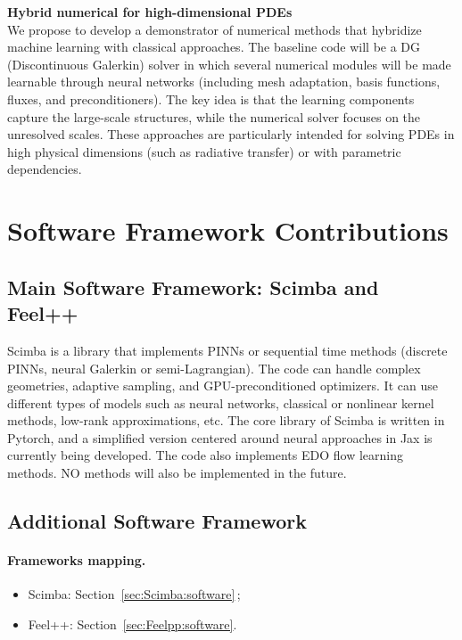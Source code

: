 \textbf{Hybrid numerical for high-dimensional PDEs}\\

We  propose  to  develop  a demonstrator  of  numerical  methods  that
hybridize  machine learning  with classical  approaches. The  baseline
code will  be a  DG (Discontinuous Galerkin)  solver in  which several
numerical  modules  will be  made  learnable  through neural  networks
(including   mesh    adaptation,   basis   functions,    fluxes,   and
preconditioners). The key idea is that the learning components capture
the large-scale structures, while the  numerical solver focuses on the
unresolved  scales. These  approaches  are  particularly intended  for
solving PDEs in high physical  dimensions (such as radiative transfer)
or with parametric dependencies.

\section{Software Framework Contributions}

\subsection{Main Software Framework: Scimba and Feel++}

Scimba is a  library that implements PINNs or  sequential time methods
(discrete PINNs,  neural Galerkin  or semi-Lagrangian).  The  code can
handle complex  geometries, adaptive sampling,  and GPU-preconditioned
optimizers.   It can  use different  types  of models  such as  neural
networks,   classical   or    nonlinear   kernel   methods,   low-rank
approximations,  etc.   The  core  library of  Scimba  is  written  in
Pytorch, and a simplified version centered around neural approaches in
Jax is  currently being developed.  The code also implements  EDO flow
learning methods.  NO methods will also be implemented in the future.

\subsection{Additional Software Framework}


\paragraph{Frameworks mapping.}
\begin{itemize}
  \item Scimba: Section~\ref{sec:Scimba:software}\,; 
  \item Feel++: Section~\ref{sec:Feelpp:software}.
\end{itemize}

